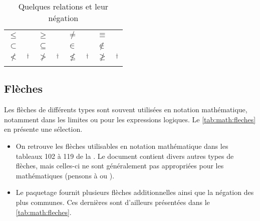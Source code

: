 \begin{table}
  \caption{Quelques relations et leur négation}
  \label{tab:math:relations}
  \begin{tabularx}{1.0\linewidth}{lXlXlXlX}
    $\leq$      & \cmd{\leq} &
    $\geq$      & \cmd{\geq}   &
    $\neq$      & \cmd{\neq}    &
    $\equiv$    & \cmd{\equiv}    \\
    $\subset$   & \cmd{\subset} &
    $\subseteq$ & \cmd{\subseteq}  &
    $\in$       & \cmd{\in} &
    $\notin$    & \cmd{\notin} \\
    $\nless$    & \cmd{\nless}$^\dagger$ &
    $\ngtr$     & \cmd{\ngtr}$^\dagger$   &
    $\nleq$     & \cmd{\nleq}$^\dagger$    &
    $\ngeq$     & \cmd{\ngeq}$^\dagger$ \\
    \addlinespace
  \end{tabularx}
\end{table}

\subsection{Flèches}
\label{sec:math:symboles:fleches}

Les flèches de différents types sont souvent utilisées en notation
mathématique, notamment dans les limites ou pour les expressions
logiques. Le \autoref{tab:math:fleches} en présente une sélection.

\begin{itemize}
\item On retrouve les flèches utilisables en notation mathématique
  dans les tableaux 102 à 119 de la %
  . %
  Le document contient divers autres types de flèches, mais celles-ci
  ne sont généralement pas appropriées pour les mathématiques (pensons
  à {\manerrarrow} ou {\faArrowRight}).
\item Le paquetage  fournit plusieurs flèches
  additionnelles ainsi que la négation des plus communes. Ces
  dernières sont d'ailleurs présentées dans le
  \autoref{tab:math:fleches}.
\end{itemize}


